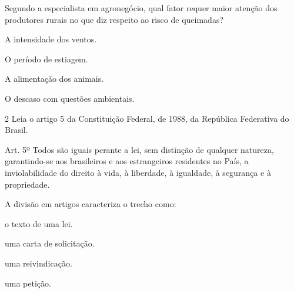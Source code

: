 
Segundo a especialista em agronegócio, qual fator requer maior atenção
dos produtores rurais no que diz respeito ao risco de queimadas?

\begin{escolha}
    
    \item A intensidade dos ventos.
    
    \item O período de estiagem.
    
    \item A alimentação dos animais.
    
    \item O descaso com questões ambientais.

\end{escolha}
  
\num{2} Leia o artigo 5 da Constituição Federal, de 1988, da República
Federativa do Brasil.

\begin{myquote}

Art. 5º Todos são iguais perante a lei, sem distinção de qualquer
natureza, garantindo-se aos brasileiros e aos estrangeiros residentes no
País, a inviolabilidade do direito à vida, à liberdade, à igualdade, à
segurança e à propriedade.


\end{myquote}


A divisão em artigos caracteriza o trecho como:

\begin{escolha}

    \item o texto de uma lei.

    \item uma carta de solicitação.

    \item uma reivindicação.

    \item uma petição.

\end{escolha}

